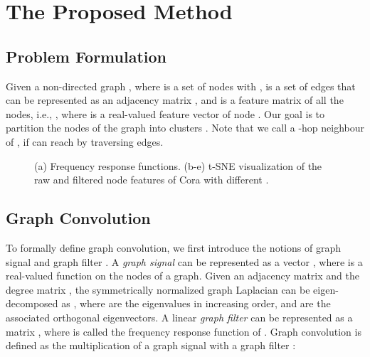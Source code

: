 \documentclass{article}
\begin{document}
 
\section{The Proposed Method}


\subsection{Problem Formulation}

Given a non-directed graph , where  is a set of nodes with ,  is a set of edges that can be represented as an adjacency matrix , and  is a feature matrix of all the nodes, i.e., , where  is a real-valued feature vector of node . Our goal is to partition the nodes of the graph  into  clusters .
Note that we call  a -hop neighbour of , if  can reach  by traversing  edges.



\begin{figure*}[t]
    \centering
    \hfil
    \hfil
    \subfigure[]{\texttt{[image: ./image/cora\_k=1.pdf]}
    \label{fig2}}
    \hfil
    \subfigure[]{\texttt{[image: ./image/cora\_k=12.pdf]}
    \label{fig3}}
    \hfil
    \subfigure[]{\texttt{[image: ./image/cora\_k=100.pdf]}
    \label{fig4}}
    \caption{(a) Frequency response functions. (b-e) t-SNE visualization of the raw and filtered node features of Cora with different .}
    \label{fig:frequency}
\end{figure*}

\subsection{Graph Convolution}
To formally define graph convolution, we first introduce the notions of graph signal and graph filter \cite{shuman2013emerging}.
A \emph{graph signal} can be represented as a vector , where  is a real-valued function on the nodes of a graph.
Given an adjacency matrix  and the degree matrix , the symmetrically normalized graph Laplacian  can be eigen-decomposed as , where  are the eigenvalues in increasing order, and  are the associated orthogonal eigenvectors. A linear \emph{graph filter} can be represented as a matrix , where  is called the frequency response function of .
Graph convolution is defined as the multiplication of a graph signal  with a graph filter :
\end{document}
